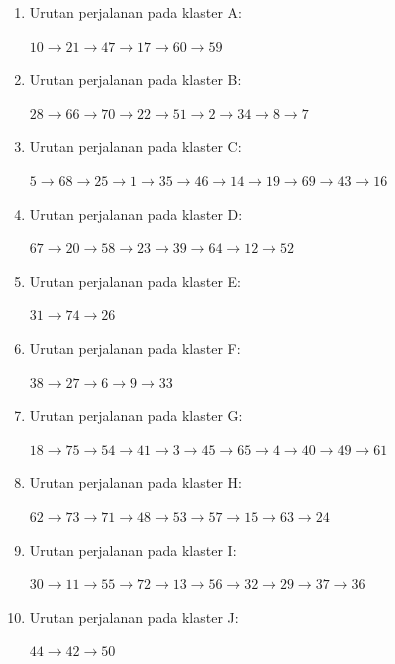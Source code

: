 \begin{enumerate}
\item Urutan perjalanan pada klaster A:

$10\rightarrow21\rightarrow47\rightarrow17\rightarrow60\rightarrow59$

\item Urutan perjalanan pada klaster B:

$28\rightarrow66\rightarrow70\rightarrow22\rightarrow51\rightarrow2\rightarrow34\rightarrow8\rightarrow7$

\item Urutan perjalanan pada klaster C:

$5\rightarrow68\rightarrow25\rightarrow1\rightarrow35\rightarrow46\rightarrow14\rightarrow19\rightarrow69\rightarrow43\rightarrow16$

\item Urutan perjalanan pada klaster D:

$67\rightarrow20\rightarrow58\rightarrow23\rightarrow39\rightarrow64\rightarrow12\rightarrow52$

\item Urutan perjalanan pada klaster E:

$31\rightarrow74\rightarrow26$

\item Urutan perjalanan pada klaster F:

$38\rightarrow27\rightarrow6\rightarrow9\rightarrow33$

\item Urutan perjalanan pada klaster G:

$18\rightarrow75\rightarrow54\rightarrow41\rightarrow3\rightarrow45\rightarrow65\rightarrow4\rightarrow40\rightarrow49\rightarrow61$

\item Urutan perjalanan pada klaster H:

$62\rightarrow73\rightarrow71\rightarrow48\rightarrow53\rightarrow57\rightarrow15\rightarrow63\rightarrow24$

\item Urutan perjalanan pada klaster I:

$30\rightarrow11\rightarrow55\rightarrow72\rightarrow13\rightarrow56\rightarrow32\rightarrow29\rightarrow37\rightarrow36$

\item Urutan perjalanan pada klaster J:

$44\rightarrow42\rightarrow50$

\end{enumerate}


